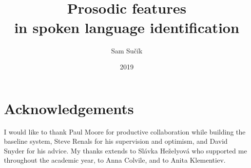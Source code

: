 \documentclass[bsc,frontabs,twoside,singlespacing,parskip,deptreport]{infthesis}
\begin{document}
\title{\vspace{-5.0cm}  \vspace{1cm} \\ Prosodic features \\in spoken language identification}

\author{Sam Su\v{c}\'ik}

\project{\vspace{3cm}{\bf MInf Project (Part 1) Report}}

\date{2019}


\maketitle

\section*{Acknowledgements}{
  I would like to thank Paul Moore for productive collaboration while building the baseline system, Steve Renals for his supervision and optimism, and David Snyder for his advice. 
  My thanks extends to Sl\'avka He\v{z}elyov\'a who supported me throughout the academic year, to Anna Colvile, and to Anita Klementiev.
}

\tableofcontents

\end{document}
